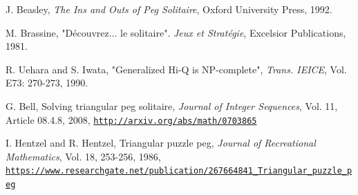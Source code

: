 \documentclass{article}
\begin{document}
\newpage
\begin{thebibliography}{mybib} 

 J. Beasley, \textit{The Ins and Outs of Peg Solitaire}, Oxford University Press, 1992.

 M. Brassine, "D\'ecouvrez... le solitaire". \textit{Jeux et Strat\'egie}, Excelsior Publications, 1981.

 R. Uehara and S. Iwata, "Generalized Hi-Q is NP-complete", \textit{Trans. IEICE}, Vol. E73: 270-273, 1990.

 G. Bell, Solving triangular peg solitaire, \textit{Journal of Integer Sequences}, Vol. 11, Article 08.4.8, 2008,\newline
\href{http://arxiv.org/abs/math/0703865}{\tt http://arxiv.org/abs/math/0703865}

 I. Hentzel and R. Hentzel, Triangular puzzle peg, \textit{Journal of Recreational Mathematics}, Vol. 18, 253-256, 1986,\newline
\href{https://www.researchgate.net/publication/267664841_Triangular_puzzle_peg}
{\tt https://www.researchgate.net/publication/267664841_Triangular_puzzle_peg}

\end{thebibliography}
\end{document}
